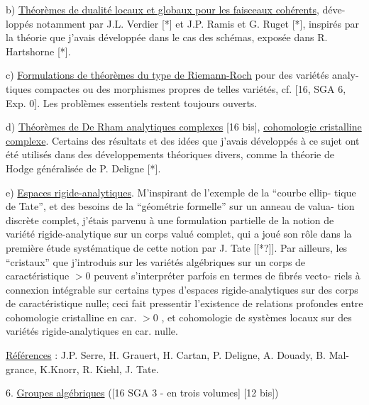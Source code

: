 \documentclass[11pt]{article}
\newcommand{\scanpage}[1]{\par\bigskip\noindent{\small\sffamily[scan #1]}\par}
\newcommand{\mspage}[1]{{\small\sffamily[p.\,#1]}}
\newcommand{\hand}[1]{\textcolor{blue}{#1}}
\newcommand{\uline}[1]{\underline{#1}}
\newcommand{\unsure}[1]{[#1?]}
\begin{document}
b) \uline{Théorèmes de dualité locaux et globaux pour les faisceaux cohérents}, déve-%
loppés notamment par J.L. Verdier [*] et J.P. Ramis et G. Ruget [*], inspirés
par la théorie que j'avais développée dans le cas des schémas, exposée dans
R. Hartshorne [*].

c) \uline{Formulations de théorèmes du type de Riemann-Roch} pour des variétés analy-%
tiques compactes ou des morphismes propres de telles variétés, cf. [16, SGA 6,
Exp. 0]. Les problèmes essentiels restent toujours ouverts.

d) \uline{Théorèmes de De Rham analytiques complexes} [16 bis], \uline{cohomologie cristalline}
\uline{complexe}. Certains des résultats et des idées que j'avais développés à ce
sujet ont été utilisés dans des développements théoriques divers, comme la
théorie de Hodge généralisée de P. Deligne [*].

\mspage{\hand{200.}}

\clearpage
\scanpage{119/201}
\mspage{- 6 -}

e) \uline{Espaces rigide-analytiques}. M'inspirant de l'exemple de la ``courbe ellip-%
tique de Tate'', et des besoins de la ``géométrie formelle'' sur un anneau de valua-%
tion discrète complet, j'étais parvenu à une formulation partielle de la notion
de variété rigide-analytique sur un corps valué complet, qui a joué son rôle dans
la première étude systématique de cette notion par J. Tate [\unsure{*}]. Par ailleurs,
les ``cristaux'' que j'introduis sur les variétés algébriques sur un corps de
caractéristique $>0$ peuvent s'interpréter parfois en termes de fibrés vecto-%
riels à connexion intégrable sur certains types d'espaces rigide-analytiques
sur des corps de caractéristique nulle; ceci fait pressentir l'existence de
relations profondes entre cohomologie cristalline en car. $>0$ , et cohomologie
de systèmes locaux sur des variétés rigide-analytiques en car. nulle.

\uline{Références} : J.P. Serre, H. Grauert, H. Cartan, P. Deligne, A. Douady, B. Mal-%
grance, K.Knorr, R. Kiehl, J. Tate.

6. \uline{Groupes algébriques} ([16 SGA 3 - en trois volumes] [12 bis])
\end{document}
